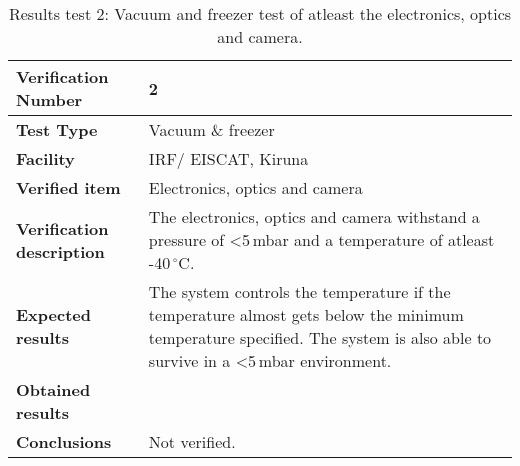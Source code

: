 \begin{table}[H]
\centering

\begin{tabular}{|m{}| m{} |}
\hline
\textbf{Verification Number} 		& 2 							 \\ \hline
\textbf{Test Type} 					& Vacuum \& freezer				 \\ \hline
\textbf{Facility} 					& IRF/ EISCAT, Kiruna 			 \\ \hline
\textbf{Verified item} 				& Electronics, optics and camera \\ \hline

\textbf{Verification description} 	& The electronics, optics and camera withstand a pressure of <5\,mbar and a temperature of atleast -40\,$^\circ$C. \\ \hline

\textbf{Expected results} 			& The system controls the temperature if the temperature almost gets below the minimum temperature specified. The system is also able to survive in a <5\,mbar environment.\\ \hline

\textbf{Obtained results} 			& \\ \hline

\textbf{Conclusions} 				& Not verified.		\\ \hline
\end{tabular}
\caption{Results test 2: Vacuum and freezer test of atleast the electronics, optics and camera.}
\label{tab:testresult2:thermal}
\end{table}


\raggedbottom